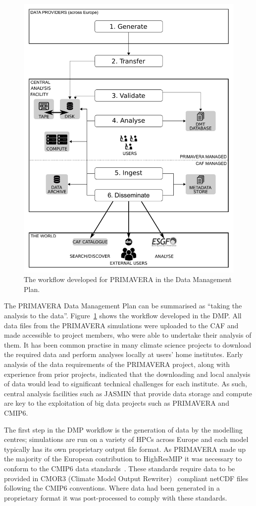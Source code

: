 \documentclass[gmd, manuscript]{copernicus}
\begin{document}
\begin{figure}[t]
\includegraphics[width=12cm]{fig01.pdf}
\caption{The workflow developed for PRIMAVERA in the Data Management Plan.}
\label{dmp_workflow}
\end{figure}

The PRIMAVERA Data Management Plan can be summarised as ``taking the analysis to the data''. Figure~\ref{dmp_workflow} shows the workflow developed in the DMP. All data files from the PRIMAVERA simulations were uploaded to the CAF and made accessible to project members, who were able to undertake their analysis of them. It has been common practise in many climate science projects to download the required data and perform analyses locally at users' home institutes. Early analysis of the data requirements of the PRIMAVERA project, along with experience from prior projects, indicated that the downloading and local analysis of data would lead to significant technical challenges for each institute. As such, central analysis facilities such as JASMIN that provide data storage and compute are key to the exploitation of big data projects such as PRIMAVERA and CMIP6.

The first step in the DMP workflow is the generation of data by the modelling centres; simulations are run on a variety of HPCs across Europe and each model typically has its own proprietary output file format. As PRIMAVERA made up the majority of the European contribution to HighResMIP it was necessary to conform to the  CMIP6 data standards~\citep{gmd-11-3659-2018}. These standards require data to be provided in CMOR3 (Climate Model Output Rewriter)~\citep{Nadeau2019} compliant netCDF files following the CMIP6 conventions. Where data had been generated in a proprietary format it was post-processed to comply with these standards.
\end{document}
